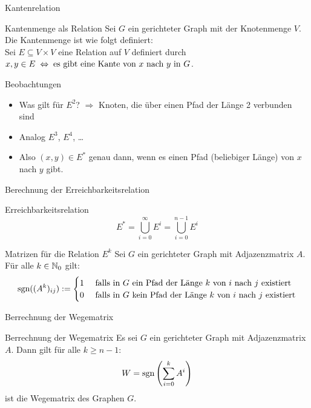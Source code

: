\begin{frame}{Kantenrelation}
	\begin{block}{Kantenmenge als Relation}
		Sei $G$ ein gerichteter Graph mit der Knotenmenge $V$. Die Kantenmenge ist wie folgt definiert:\\
		Sei $E \subseteq V \times V$ eine Relation auf $V$ definiert durch $x,y \in E \gdw \text{es gibt eine Kante von $x$ nach }y \text{ in } G$.
	\end{block}

	\begin{exampleblock}{Beobachtungen}
		\begin{itemize}
			\item Was gilt für $E^2$? \pause $\Rightarrow$ Knoten, die über einen Pfad der Länge 2 verbunden sind
			\item Analog $E^3$, $E^4$, \dots
			\item Also $(x,y) \in E^*$ genau dann, wenn es einen Pfad (beliebiger Länge) von $x$ nach $y$ gibt.
		\end{itemize}
	\end{exampleblock}
\end{frame}

\begin{frame}{Berechnung der Erreichbarkeitsrelation}
    \begin{block}{Erreichbarkeitsrelation}
    	\[
    		E^* = \bigcup_{i=0}^{\infty} E^i = \bigcup_{i=0}^{n-1} E^i
    	\]
    \end{block}

    \begin{block}{Matrizen für die Relation $E^k$}
    	Sei $G$ ein gerichteter Graph mit Adjazenzmatrix $A$. Für alle $k \in \mathbb{N}_0$ gilt:
    	\[
    		\mathop{\text{sgn}}((A^k)_{ij}):=
    		\begin{cases}
      		1 & \text{ falls in $G$ ein Pfad der Länge $k$ von $i$ nach $j$ existiert}\\
      		0 & \text{ falls in $G$ kein Pfad der Länge $k$ von $i$ nach $j$ existiert}\\
    		\end{cases}
    	\]
    \end{block}
\end{frame}

\begin{frame}{Berrechnung der Wegematrix}	
    \begin{block}{Berrechnung der Wegematrix}
    	Es sei $G$ ein gerichteter Graph mit Adjazenzmatrix $A$. Dann gilt für alle $k\geq n-1$: 
    	\[
    		W = \mathop{\text{sgn}}\left(\sum_{i=0}^{k} A^i\right) 
    	\]
    	ist die Wegematrix des Graphen $G$.
    \end{block}
\end{frame}
